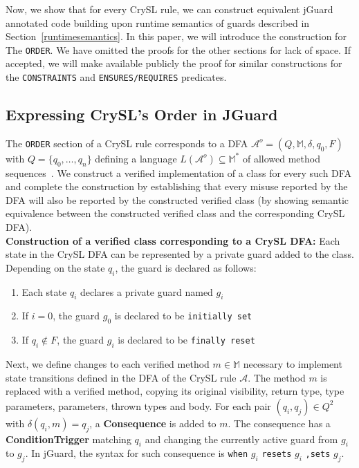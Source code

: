 \documentclass{article}
\newcommand{\todo}[1]{{\color{red} \textbf{TODO: } #1}}
\begin{document}
Now,  we show that for every CrySL rule, we can construct equivalent jGuard annotated code building upon runtime semantics of guards described in Section~\ref{runtimesemantics}. In this paper, we will introduce the construction for The \texttt{ORDER}. We have omitted the proofs for the other sections for lack of space. If accepted, we will make available publicly the proof for similar constructions for the \texttt{CONSTRAINTS} and \texttt{ENSURES/REQUIRES} predicates. 

\subsection{Expressing CrySL's Order in JGuard}\label{sec:CrySL:Order}

The \texttt{ORDER} section of a CrySL rule corresponds to a DFA 
$\mathcal{A}^o = (Q, \mathbb{M}, \delta, q_0, F)$ with $Q = \{ q_0, \ldots, q_n \}$
defining a language $L(\mathcal{A}^o) \subseteq \mathbb{M}^*$ of allowed method sequences~\cite{CrySL}. 
We construct a verified implementation of a class for every such DFA and complete the construction by establishing that every misuse reported by the DFA will also be reported by the constructed verified class (by showing semantic equivalence between the constructed verified class and the corresponding CrySL DFA).\\

\noindent
\textbf{Construction of a verified class corresponding to a CrySL DFA: }
Each state in the CrySL DFA can be represented by a private guard added to the
class. Depending on the state $q_i$, the guard is declared as follows:

\begin{enumerate}
  \item Each state $q_i$ declares a private guard named $g_i$
  \item If $i = 0$, the guard $g_0$ is declared to be \texttt{initially set}
  \item If $q_i \not \in F$, the guard $g_i$ is declared to be \texttt{finally reset}
\end{enumerate}

Next, we define changes to each verified method $m \in \mathbb{M}$ necessary to implement
state transitions defined in the DFA of the CrySL rule $\mathcal{A}$. The method $m$ is replaced with a verified method, copying its original visibility,
return type, type parameters, parameters, thrown types and body.
For each pair $(q_i, q_j) \in Q^2$ with $\delta(q_i, m) = q_j$, a \textbf{Consequence}
is added to $m$.
The consequence has a \textbf{ConditionTrigger} matching $q_i$ and changing the currently
active guard from $g_i$ to $g_j$.
In jGuard, the syntax for such consequence is \texttt{when} $g_i$ \texttt{resets} $g_i$ \texttt{,sets} $g_j$.\\
\end{document}

